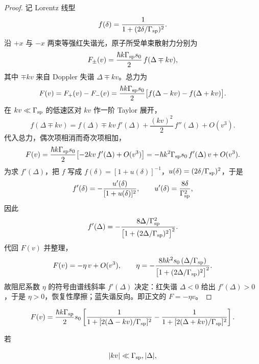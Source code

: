 \begin{proof}
记 Lorentz 线型
\begin{equation*}
f(\delta)=\frac{1}{1+(2\delta/\Gamma_{\rm sp})^2}.
\end{equation*}
沿 $+x$ 与 $-x$ 两束等强红失谐光，原子所受单束散射力分别为
\begin{equation*}
F_\pm(v)=\frac{\hbar k\Gamma_{\rm sp}s_0}{2}\,f(\Delta\mp kv),
\end{equation*}
其中 $\mp kv$ 来自 Doppler 失谐 $\Delta\mp kv$。总力为
\begin{equation*}
F(v)=F_+(v)-F_-(v)
=\frac{\hbar k\Gamma_{\rm sp}s_0}{2}\bigl[f(\Delta-kv)-f(\Delta+kv)\bigr].
\end{equation*}
在 $kv\ll\Gamma_{\rm sp}$ 的低速区对 $kv$ 作一阶 Taylor 展开，
\begin{equation*}
f(\Delta\mp kv)=f(\Delta)\mp kv\,f'(\Delta)+\frac{(kv)^2}{2}\,f''(\Delta)+O(v^3).
\end{equation*}
代入总力，偶次项相消而奇次项相加，
\begin{equation*}
F(v)=\frac{\hbar k\Gamma_{\rm sp}s_0}{2}\bigl[-2kv\,f'(\Delta)+O(v^3)\bigr]
=-\hbar k^2\Gamma_{\rm sp}s_0\,f'(\Delta)\,v+O(v^3).
\end{equation*}
为求 $f'(\Delta)$，把 $f$ 写成 $f(\delta)=[1+u(\delta)]^{-1}$，$u(\delta)=(2\delta/\Gamma_{\rm sp})^2$，于是
\begin{equation*}
f'(\delta)=-\frac{u'(\delta)}{[1+u(\delta)]^2},
\qquad
u'(\delta)=\frac{8\delta}{\Gamma_{\rm sp}^2},
\end{equation*}
因此
\begin{equation*}
f'(\Delta)
=-\frac{8\Delta/\Gamma_{\rm sp}^2}{\bigl[1+(2\Delta/\Gamma_{\rm sp})^2\bigr]^2}.
\end{equation*}
代回 $F(v)$ 并整理，
\begin{equation*}
F(v)=-\eta\,v+O(v^3),
\qquad
\eta=-\frac{8\hbar k^2 s_0\,(\Delta/\Gamma_{\rm sp})}{\bigl[1+(2\Delta/\Gamma_{\rm sp})^2\bigr]^2}.
\end{equation*}
故阻尼系数 $\eta$ 的符号由谱线斜率 $f'(\Delta)$ 决定：红失谐 $\Delta<0$ 给出 $f'(\Delta)>0$，于是 $\eta>0$，恢复性摩擦；蓝失谐反向。即正文的 $F=-\eta v$。
\end{proof}

\[
F(v)=\frac{\hbar k\Gamma_{\rm sp}}{2}s_0
\left[
\frac{1}{1+[2(\Delta-kv)/\Gamma_{\rm sp}]^2}
-\frac{1}{1+[2(\Delta+kv)/\Gamma_{\rm sp}]^2}
\right].
\]

若

\[
|kv|\ll\Gamma_{\rm sp},|\Delta|,
\]

